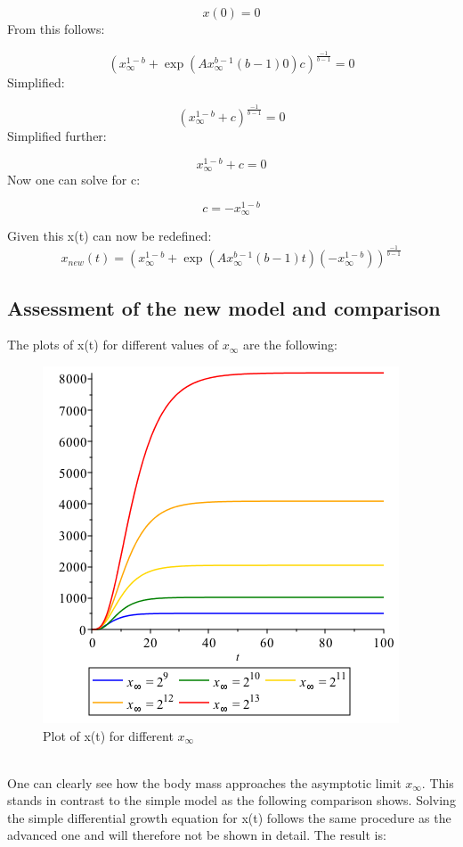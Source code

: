 \documentclass{article}
\numberwithin{equation}{section} %
\begin{document}
\begin{equation}
    x(0) = 0
\end{equation}
From this follows:

\begin{equation}
    \left( x_\infty^{1-b}+\exp(Ax_\infty^{b-1}(b-1)0)c \right)^{\tfrac{-1}{b-1}}=0
\end{equation}
Simplified:

\begin{equation}
    \left( x_\infty^{1-b}+c\right)^{\tfrac{-1}{b-1}}=0
\end{equation}
Simplified further:

\begin{equation}
    x_\infty^{1-b}+c=0
\end{equation}
Now one can solve for c:

\begin{equation}
    c=-x_\infty^{1-b}
\end{equation}

Given this x(t) can now be redefined:
\begin{equation}
    x_{new}(t)=\left( x_\infty^{1-b}+\exp(Ax_\infty^{b-1}(b-1)t)(-x_\infty^{1-b}) \right)^{\tfrac{-1}{b-1}}
\end{equation}

\subsection{Assessment of the new model and comparison}\label{sec:Ex6C}
The plots of x(t) for different values of $x_\infty$ are the following:

\begin{figure}[H]
\centering
\includegraphics[width=.55\textwidth]{exercises/ex6p1}
	\caption{Plot of x(t) for different $x_\infty$}
	\label{fig:ex6p1}
\end{figure}\\
One can clearly see how the body mass approaches the asymptotic limit $x_\infty$. This stands in contrast to the simple model as the following comparison shows.
Solving the simple differential growth equation for x(t) follows the same procedure as the advanced one and will therefore not be shown in detail. The result is:
\end{document}
